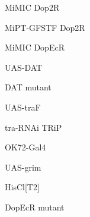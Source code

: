 \documentclass[17pt]{extarticle}
\begin{document}
\newpage\vspace*{-0.15cm}
\begin{normalsize}
Mi{MIC} Dop2R \\[0.5em]
\end{normalsize}
\footnotesize
\newpage\vspace*{-0.15cm}
\begin{footnotesize}
Mi{PT-GFSTF} Dop2R \\[0.5em]
\end{footnotesize}
\footnotesize
\newpage\vspace*{-0.15cm}
\begin{normalsize}
Mi{MIC} DopEcR \\[0.5em]
\end{normalsize}
\footnotesize
\newpage\vspace*{-0.15cm}
\begin{large}
UAS-DAT \\[0.5em]
\end{large}
\footnotesize
\newpage\vspace*{-0.15cm}
\begin{large}
DAT mutant \\[0.5em]
\end{large}
\footnotesize
\newpage\vspace*{-0.15cm}
\begin{large}
UAS-traF \\[0.5em]
\end{large}
\footnotesize
\newpage\vspace*{-0.15cm}
\begin{normalsize}
tra-RNAi TRiP \\[0.5em]
\end{normalsize}
\footnotesize
\newpage\vspace*{-0.15cm}
\begin{large}
OK72-Gal4 \\[0.5em]
\end{large}
\footnotesize
\newpage\vspace*{-0.15cm}
\begin{large}
UAS-grim \\[0.5em]
\end{large}
\footnotesize
\newpage\vspace*{-0.15cm}
\begin{large}
HisCl[T2] \\[0.5em]
\end{large}
\footnotesize
\newpage\vspace*{-0.15cm}
\begin{normalsize}
DopEcR mutant \\[0.5em]
\end{normalsize}
\end{document}
